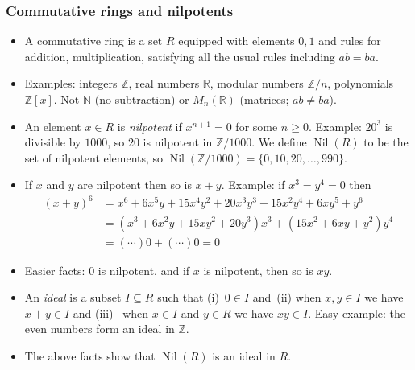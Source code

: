 \documentclass[9pt]{beamer}
\newcommand{\Nil}       {\operatorname{Nil}}
\newcommand{\R}         {{\mathbb{R}}}
\newcommand{\Z}         {{\mathbb{Z}}}
\newcommand{\N}         {{\mathbb{N}}}
\begin{document}
\begin{frame}[t]
 \frametitle{Commutative rings and nilpotents}

 \begin{itemize}
  \item A commutative ring is a set $R$ equipped with elements $0,1$ and
   rules for addition, multiplication, satisfying all the usual rules
   including $ab=ba$.
  \item Examples: integers $\Z$, real numbers $\R$, modular numbers
   $\Z/n$, polynomials $\Z[x]$.  Not $\N$ (no subtraction) or
   $M_n(\R)$ (matrices; $ab\neq ba$).
  \item An element $x\in R$ is
   \emph{nilpotent} if $x^{n+1}=0$ for some $n\geq 0$.  Example:
   $20^3$ is divisible by $1000$, so $20$ is nilpotent in $\Z/1000$.
   We define $\Nil(R)$ to be the set of nilpotent elements, so
   $\Nil(\Z/1000)=\{0,10,20,\dotsc,990\}$. 
  \item If $x$ and $y$ are nilpotent then so is $x+y$.  Example: if
   $x^3=y^4=0$ then
   \begin{align*}
    (x+y)^6 &=
      x^6 + 6x^5y + 15x^4y^2 + 20 x^3y^3 + 15x^2y^4 + 6xy^5 + y^6 \\
      &= (x^3+6x^2y+15xy^2+20y^3)x^3 + (15x^2+6xy+y^2)y^4 \\
      &= (\dotsb)0 + (\dotsb)0 = 0
   \end{align*}
  \item Easier facts: $0$ is nilpotent, and if $x$ is nilpotent, then
   so is $xy$.
  \item An \emph{ideal} is a subset $I\subseteq R$ such that
   (i)~$0\in I$ and~(ii) when $x,y\in I$ we have $x+y\in I$ and (iii)~
   when $x\in I$ and $y\in R$ we have $xy\in I$.  Easy example: the
   even numbers form an ideal in $\Z$.
  \item The above facts show that $\Nil(R)$ is an ideal in $R$.
 \end{itemize}
\end{frame}
\end{document}
